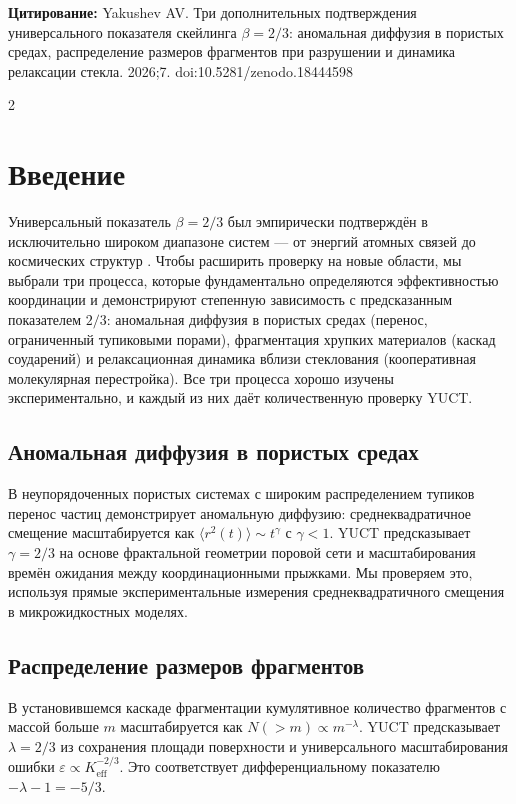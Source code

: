 \documentclass[11pt,a4paper]{article}
\newcommand{\eps}{\varepsilon}
\newcommand{\Keff}{K_{\mathrm{eff}}}
\newcommand{\betaf}{\beta}
\begin{document}
	\vspace{0.1cm}
	\noindent
	{\color{darkblue}\textbf{Цитирование:}} Yakushev AV. Три дополнительных подтверждения универсального показателя скейлинга \(\beta = 2/3\): аномальная диффузия в пористых средах, распределение размеров фрагментов при разрушении и динамика релаксации стекла. 2026;7. doi:10.5281/zenodo.18444598
	
	\vspace{0.4cm}
	\vspace*{-\baselineskip}
	\begin{multicols}{2}
		
		\section{Введение}
		
		Универсальный показатель \(\betaf = 2/3\) был эмпирически подтверждён в исключительно широком диапазоне систем — от энергий атомных связей до космических структур \cite{AppendixY, AppendixL, AppendixC, AppendixG}. Чтобы расширить проверку на новые области, мы выбрали три процесса, которые фундаментально определяются эффективностью координации и демонстрируют степенную зависимость с предсказанным показателем \(2/3\): аномальная диффузия в пористых средах (перенос, ограниченный тупиковыми порами), фрагментация хрупких материалов (каскад соударений) и релаксационная динамика вблизи стеклования (кооперативная молекулярная перестройка). Все три процесса хорошо изучены экспериментально, и каждый из них даёт количественную проверку YUCT.
		
		\subsection{Аномальная диффузия в пористых средах}
		В неупорядоченных пористых системах с широким распределением тупиков перенос частиц демонстрирует аномальную диффузию: среднеквадратичное смещение масштабируется как \(\langle r^2(t) \rangle \sim t^{\gamma}\) с \(\gamma < 1\). YUCT предсказывает \(\gamma = 2/3\) на основе фрактальной геометрии поровой сети и масштабирования времён ожидания между координационными прыжками. Мы проверяем это, используя прямые экспериментальные измерения среднеквадратичного смещения в микрожидкостных моделях.
		
		\subsection{Распределение размеров фрагментов}
		В установившемся каскаде фрагментации кумулятивное количество фрагментов с массой больше \(m\) масштабируется как \(N(>m) \propto m^{-\lambda}\). YUCT предсказывает \(\lambda = 2/3\) из сохранения площади поверхности и универсального масштабирования ошибки \(\eps \propto \Keff^{-2/3}\). Это соответствует дифференциальному показателю \(-\lambda - 1 = -5/3\).
		

\end{multicols}
\end{document}
